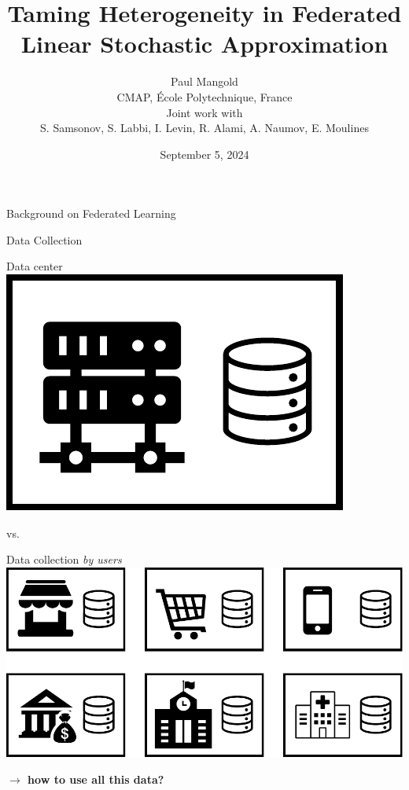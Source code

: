 \documentclass[aspectratio=169,14pt]{beamer}
\title{Taming Heterogeneity in Federated Linear Stochastic Approximation}
\author{
  \vspace{-0.5em}
  Paul Mangold\\[0.5em]
  CMAP, École Polytechnique, France
  \\[0.5em]
  \small Joint work with \\ S. Samsonov, S. Labbi, I. Levin, R. Alami, A. Naumov, E. Moulines
  \vspace{-1em}
}
\institute{}
\date{September 5, 2024}
\begin{document}

\begin{frame}[plain]
  \titlepage
\end{frame}
\addtocounter{framenumber}{-1}

\begin{frame}
  \begin{center}
    \textcolor{beamer@blendedblue}{
      \huge Background on Federated Learning
    }
  \end{center}
\end{frame}

\begin{frame}{Data Collection}
  \hspace{-3em}
  \begin{minipage}{0.5\linewidth}
    \begin{center}
      Data center\\[0.5em]
      
      \includegraphics[width=0.4\linewidth]{images/central.pdf}
    \end{center}
    
  \end{minipage}\pause vs.\hspace{1.5em}%
  \begin{minipage}{0.5\linewidth}
    \pause
    \begin{center}
      Data collection \emph{by users} \\[0.5em]
      
      \includegraphics[width=0.8\linewidth]{images/decentralized.pdf}
    \end{center}
  \end{minipage}

  \vspace{1em}

  \pause
  
  \begin{center}
    \textbf{
    $\rightarrow$ how to use all this data?}
  \end{center}
\end{frame}
\end{document}
